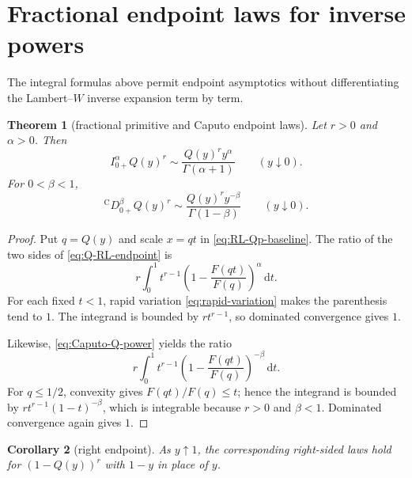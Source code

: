 \documentclass[11pt,oneside]{article}
\numberwithin{equation}{section}
\theoremstyle{plain}
\newtheorem{theorem}{Theorem}[section]
\newtheorem{corollary}[theorem]{Corollary}
\theoremstyle{definition}
\theoremstyle{remark}
\newcommand{\dd}{\,\mathrm d}
\newcommand{\Ccap}{\mathrm C}
\begin{document}
\section{Fractional endpoint laws for inverse powers}
\label{sec:endpoint-fractional}

The integral formulas above permit endpoint asymptotics without differentiating
the Lambert--$W$ inverse expansion term by term.

\begin{theorem}[fractional primitive and Caputo endpoint laws]
\label{thm:Q-fractional-endpoint}
Let $r>0$ and $\alpha>0$.  Then
\begin{equation}
 I_{0+}^\alpha Q(y)^r
 \sim\frac{Q(y)^r y^\alpha}{\Gamma(\alpha+1)}
 \qquad(y\downarrow0).
 \label{eq:Q-RL-endpoint}
\end{equation}
For $0<\beta<1$,
\begin{equation}
 {}^{\Ccap}D_{0+}^\beta Q(y)^r
 \sim\frac{Q(y)^r y^{-\beta}}{\Gamma(1-\beta)}
 \qquad(y\downarrow0).
 \label{eq:Q-Caputo-endpoint}
\end{equation}
\end{theorem}

\begin{proof}
Put $q=Q(y)$ and scale $x=qt$ in
\cref{eq:RL-Qp-baseline}.  The ratio of the two sides of
\cref{eq:Q-RL-endpoint} is
\begin{equation}
 r\int_0^1t^{r-1}
 \left(1-\frac{F(qt)}{F(q)}\right)^\alpha\dd t.
 \label{eq:RL-endpoint-ratio}
\end{equation}
For each fixed $t<1$, rapid variation \cref{eq:rapid-variation} makes the
parenthesis tend to $1$.  The integrand is bounded by $rt^{r-1}$, so dominated
convergence gives $1$.

Likewise, \cref{eq:Caputo-Q-power} yields the ratio
\begin{equation}
 r\int_0^1t^{r-1}
 \left(1-\frac{F(qt)}{F(q)}\right)^{-\beta}\dd t.
 \label{eq:Caputo-endpoint-ratio}
\end{equation}
For $q\le1/2$, convexity gives $F(qt)/F(q)\le t$; hence the integrand is bounded
by $rt^{r-1}(1-t)^{-\beta}$, which is integrable because $r>0$ and
$\beta<1$.  Dominated convergence again gives $1$.
\end{proof}

\begin{corollary}[right endpoint]
As $y\uparrow1$, the corresponding right-sided laws hold for
$(1-Q(y))^r$ with $1-y$ in place of $y$.
\end{corollary}
\end{document}
